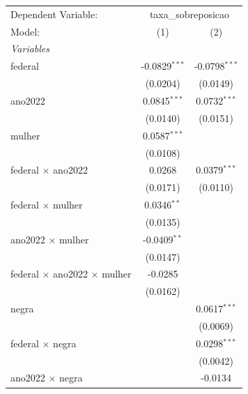 
\begingroup
\centering
\begin{tabular}{lcc}
   \tabularnewline \midrule \midrule
   Dependent Variable: & \multicolumn{2}{c}{taxa\_sobreposicao}\\
   Model:                                     & (1)             & (2)\\  
   \midrule
   \emph{Variables}\\
   federal                                    & -0.0829$^{***}$ & -0.0798$^{***}$\\   
                                              & (0.0204)        & (0.0149)\\   
   ano2022                                    & 0.0845$^{***}$  & 0.0732$^{***}$\\   
                                              & (0.0140)        & (0.0151)\\   
   mulher                                     & 0.0587$^{***}$  &   \\   
                                              & (0.0108)        &   \\   
   federal $\times$ ano2022                   & 0.0268          & 0.0379$^{***}$\\   
                                              & (0.0171)        & (0.0110)\\   
   federal $\times$ mulher                    & 0.0346$^{**}$   &   \\   
                                              & (0.0135)        &   \\   
   ano2022 $\times$ mulher                    & -0.0409$^{**}$  &   \\   
                                              & (0.0147)        &   \\   
   federal $\times$ ano2022 $\times$ mulher   & -0.0285         &   \\   
                                              & (0.0162)        &   \\   
   negra                                      &                 & 0.0617$^{***}$\\   
                                              &                 & (0.0069)\\   
   federal $\times$ negra                     &                 & 0.0298$^{***}$\\   
                                              &                 & (0.0042)\\   
   ano2022 $\times$ negra                     &                 & -0.0134\\   

\end{tabular}
